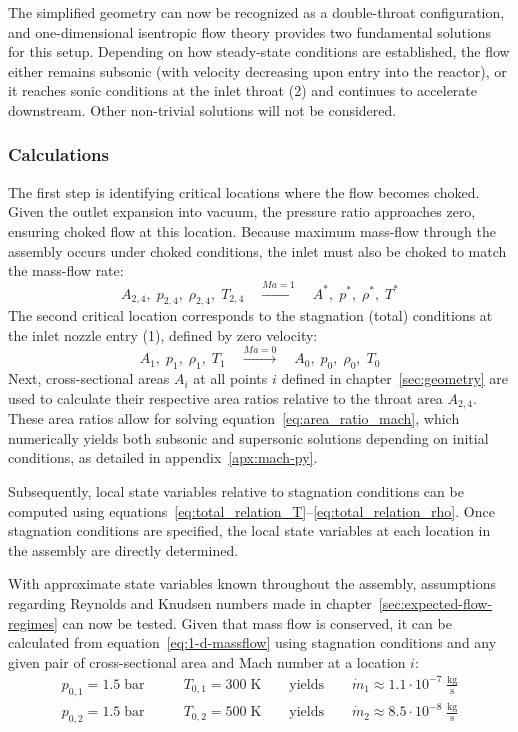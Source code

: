 The simplified geometry can now be recognized as a double-throat configuration, and one-dimensional isentropic flow theory provides two fundamental solutions for this setup.
Depending on how steady-state conditions are established, the flow either remains subsonic (with velocity decreasing upon entry into the reactor), or it reaches sonic conditions at the inlet throat (2) and continues to accelerate downstream.
Other non-trivial solutions will not be considered.
\cite{SALAS1986193, EMMONS1958}

\subsubsection*{Calculations}
	The first step is identifying critical locations where the flow becomes choked.
	Given the outlet expansion into vacuum, the pressure ratio approaches zero, ensuring choked flow at this location.
	Because maximum mass-flow through the assembly occurs under choked conditions, the inlet must also be choked to match the mass-flow rate:
	$$
		A_{2,4},\;p_{2,4},\;\rho_{2,4},\;T_{2,4}
			\quad \xrightarrow {Ma = 1} \quad
		A^*,\;p^*,\;\rho^*,\;T^*
	$$
	The second critical location corresponds to the stagnation (total) conditions at the inlet nozzle entry (1), defined by zero velocity:
	$$
		A_1,\;p_1,\;\rho_1,\;T_1
			\quad \xrightarrow{Ma=0} \quad
		A_0,\;p_0,\;\rho_0,\;T_0
	$$
	Next, cross-sectional areas $A_i$ at all points $i$ defined in chapter~\ref{sec:geometry} are used to calculate their respective area ratios relative to the throat area $A_{2,4}$.
	These area ratios allow for solving equation~\eqref{eq:area_ratio_mach}, which numerically yields both subsonic and supersonic solutions depending on initial conditions, as detailed in appendix~\ref{apx:mach-py}.

	Subsequently, local state variables relative to stagnation conditions can be computed using equations~\eqref{eq:total_relation_T}–\eqref{eq:total_relation_rho}.
	Once stagnation conditions are specified, the local state variables at each location in the assembly are directly determined.

	

	With approximate state variables known throughout the assembly, assumptions regarding Reynolds and Knudsen numbers made in chapter~\ref{sec:expected-flow-regimes} can now be tested.
	Given that mass flow is conserved, it can be calculated from equation~\eqref{eq:1-d-massflow} using stagnation conditions and any given pair of cross-sectional area and Mach number at a location $i$:
	\begin{align*}
		p_{0,1} = 1.5\;\text{bar}
			&\qquad T_{0,1} = 300\;\text{K}
				\qquad \text{yields} \qquad
			\dot{m}_1 \approx 1.1 \cdot 10^{-7} \; \frac{\text{kg}}{\text{s}}\\
		p_{0,2} = 1.5\;\text{bar}
			&\qquad T_{0,2} = 500\;\text{K}
				\qquad \text{yields} \qquad
			\dot{m}_2 \approx 8.5 \cdot 10^{-8} \; \frac{\text{kg}}{\text{s}}
	\end{align*}

